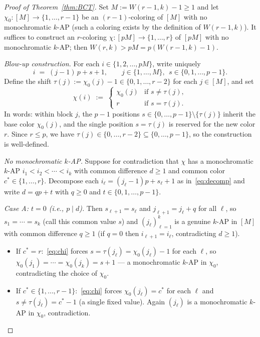 \documentclass[11pt,reqno,a4paper]{amsart}
\theoremstyle{plain}
\theoremstyle{definition}
\theoremstyle{remark}
\numberwithin{equation}{section}
\begin{document}
\begin{proof}[Proof of Theorem~\ref{thm:BCT}]
Set $M:=W(r-1,k)-1\ge 1$ and let
$\chi_{0}:[M]\to\{1,\ldots,r-1\}$ be an $(r-1)$-coloring of $[M]$
with no monochromatic $k$-AP (such a coloring exists by the definition
of $W(r-1,k)$). It suffices to construct an $r$-coloring
$\chi:[pM]\to\{1,\ldots,r\}$ of $[pM]$ with no monochromatic $k$-AP;
then $W(r,k)>pM=p(W(r-1,k)-1)$.

\medskip
\emph{Blow-up construction.} For each $i\in\{1,2,\ldots,pM\}$, write
uniquely
\begin{equation}
i\;=\;(j-1)\,p+s+1,\qquad j\in\{1,\ldots,M\},\ \ s\in\{0,1,\ldots,p-1\}.
\label{eq:decomp}
\end{equation}
Define the shift $\tau(j):=\chi_{0}(j)-1\in\{0,1,\ldots,r-2\}$ for
each $j\in[M]$, and set
\begin{equation}
\chi(i)\;:=\;
\begin{cases}
\chi_{0}(j) & \text{if }s\ne\tau(j),\\
r & \text{if }s=\tau(j).
\end{cases}
\label{eq:chi}
\end{equation}
In words: within block $j$, the $p-1$ positions
$s\in\{0,\ldots,p-1\}\setminus\{\tau(j)\}$ inherit the base color
$\chi_{0}(j)$, and the single position $s=\tau(j)$ is reserved for
the new color $r$. Since $r\le p$, we have
$\tau(j)\in\{0,\ldots,r-2\}\subseteq\{0,\ldots,p-1\}$, so the
construction is well-defined.

\medskip
\emph{No monochromatic $k$-AP.} Suppose for contradiction that $\chi$
has a monochromatic $k$-AP $i_{1}<i_{2}<\cdots<i_{k}$ with common
difference $d\ge 1$ and common color $c^{*}\in\{1,\ldots,r\}$.
Decompose each $i_{\ell}=(j_{\ell}-1)p+s_{\ell}+1$ as
in~\eqref{eq:decomp} and write $d=qp+t$ with $q\ge 0$ and
$t\in\{0,1,\ldots,p-1\}$.

\emph{Case A: $t=0$ (i.e., $p\mid d$).} Then $s_{\ell+1}=s_{\ell}$ and
$j_{\ell+1}=j_{\ell}+q$ for all $\ell$, so $s_{1}=\cdots=s_{k}$ (call
this common value $s$) and $(j_{\ell})_{\ell=1}^{k}$ is a genuine
$k$-AP in $[M]$ with common difference $q\ge 1$ (if $q=0$ then
$i_{\ell+1}=i_{\ell}$, contradicting $d\ge 1$).

\begin{itemize}
\item If $c^{*}=r$:~\eqref{eq:chi} forces
  $s=\tau(j_{\ell})=\chi_{0}(j_{\ell})-1$ for each $\ell$, so
  $\chi_{0}(j_{1})=\cdots=\chi_{0}(j_{k})=s+1$ --- a monochromatic
  $k$-AP in $\chi_{0}$, contradicting the choice of $\chi_{0}$.
\item If $c^{*}\in\{1,\ldots,r-1\}$:~\eqref{eq:chi} forces
  $\chi_{0}(j_{\ell})=c^{*}$ for each $\ell$ and
  $s\ne\tau(j_{\ell})=c^{*}-1$ (a single fixed value). Again
  $(j_{\ell})$ is a monochromatic $k$-AP in $\chi_{0}$, contradiction.
\end{itemize}


\end{proof}
\end{document}
